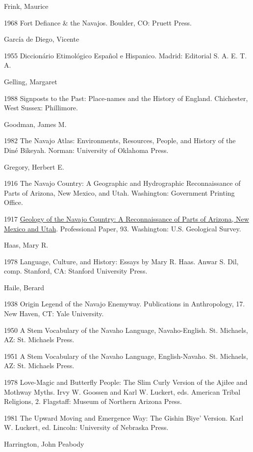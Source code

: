 Frink, Maurice

1968  Fort Defiance \& the Navajos.  Boulder, CO:  Pruett Press.

García de Diego, Vicente

1955  Diccionário Etimológico Español e Hispanico.  Madrid:  Editorial S. A. E. T. A.

Gelling, Margaret

1988  Signposts to the Past: Place-names and the History of England.  Chichester, West Sussex:  Phillimore.

Goodman, James M.  

1982  The Navajo Atlas: Environments, Resources, People, and History of the Diné Bikeyah.  Norman:  University of Oklahoma Press.

Gregory, Herbert E.  

1916  The Navajo Country: A Geographic and Hydrographic Reconnaissance of Parts of Arizona, New Mexico, and Utah.  Washington:  Government Printing Office.

1917  \href{http://melvyl.worldcat.org/title/geology-of-the-navajo-country-a-reconnaissance-of-parts-of-arizona-new-mexico-and-utah/oclc/3702525 & referer=brief_results}{Geology of the Navajo Country: A Reconnaissance of Parts of Arizona, New Mexico and Utah}.  Professional Paper, 93.  Washington:  U.S. Geological Survey.

Haas, Mary R.  

1978  Language, Culture, and History: Essays by Mary R. Haas.  Anwar S. Dil, comp.  Stanford, CA:  Stanford University Press.

Haile, Berard

1938  Origin Legend of the Navajo Enemyway.  Publications in Anthropology, 17.  New Haven, CT:  Yale University.

1950  A Stem Vocabulary of the Navaho Language, Navaho-English.  St. Michaels, AZ:  St. Michaels Press.

1951  A Stem Vocabulary of the Navaho Language, English-Navaho.  St. Michaels, AZ:  St. Michaels Press.

1978  Love-Magic and Butterfly People: The Slim Curly Version of the Ajiłee and Mothway Myths.  Irvy W. Goossen and Karl W. Luckert, eds.  American Tribal Religions, 2.  Flagstaff:  Museum of Northern Arizona Press.

1981  The Upward Moving and Emergence Way: The Gishin Biye’ Version.  Karl W. Luckert, ed.  Lincoln:  University of Nebraska Press.

Harrington, John Peabody

